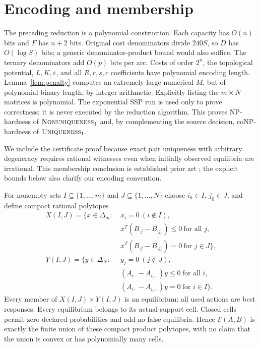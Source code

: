 \documentclass[11pt]{article}
\theoremstyle{remark}\newtheorem{remark}[theorem]{Remark}
\newcommand{\E}{\mathcal E}
\newcommand{\UNIQ}{\textsc{Uniqueness}_1}
\newcommand{\NON}{\textsc{Nonuniqueness}_1}
\newcommand{\eps}{\varepsilon}
\begin{document}
\section{Encoding and membership}
The preceding reduction is a polynomial construction. Each capacity has $O(n)$ bits and $F$ has $n+2$ bits. Original cost denominators divide $240S$, so $D$ has $O(\log S)$ bits; a generic denominator-product bound would also suffice. The ternary denominators add $O(p)$ bits per arc. Costs of order $2^n$, the topological potential, $L,K,\eps$, and all $R,r,s,c$ coefficients have polynomial encoding length. Lemma~\ref{lem:penalty} computes an extremely large numerical $M$, but of polynomial binary length, by integer arithmetic. Explicitly listing the $m\times N$ matrices is polynomial. The exponential SSP run is used only to prove correctness; it is never executed by the reduction algorithm. This proves NP-hardness of $\NON$ and, by complementing the source decision, coNP-hardness of $\UNIQ$.

We include the certificate proof because exact pair uniqueness with arbitrary degeneracy requires rational witnesses even when initially observed equilibria are irrational. This membership conclusion is established prior art \cite[\S3.13]{gz}; the explicit bounds below also clarify our encoding convention.

For nonempty sets $I\subseteq\{1,\ldots,m\}$ and $J\subseteq\{1,\ldots,N\}$ choose $i_0\in I$, $j_0\in J$, and define compact rational polytopes
\begin{align*}
 X(I,J)=\{x\in\Delta_m:\ &x_i=0\ (i\notin I),\\
 &x^T(B_{\cdot j}-B_{\cdot j_0})\le0\ \text{for all }j,\\
 &x^T(B_{\cdot j}-B_{\cdot j_0})=0\ \text{for }j\in J\},\\
 Y(I,J)=\{y\in\Delta_N:\ &y_j=0\ (j\notin J),\\
 &(A_{i\cdot}-A_{i_0\cdot})y\le0\ \text{for all }i,\\
 &(A_{i\cdot}-A_{i_0\cdot})y=0\ \text{for }i\in I\}.
\end{align*}
Every member of $X(I,J)\times Y(I,J)$ is an equilibrium: all used actions are best responses. Every equilibrium belongs to its actual-support cell. Closed cells permit zero declared probabilities and add no false equilibria. Hence $\E(A,B)$ is exactly the finite union of these compact product polytopes, with no claim that the union is convex or has polynomially many cells.
\end{document}

